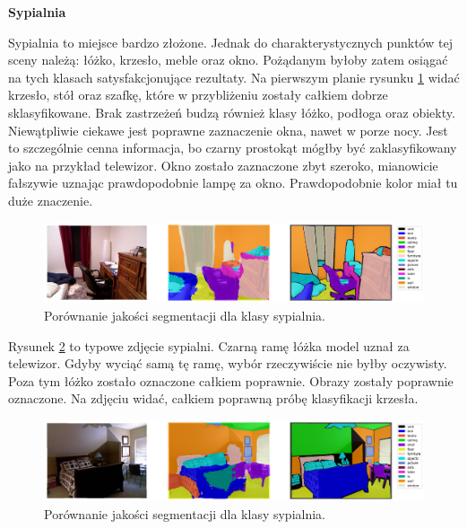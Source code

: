 \noindent
\textbf{Sypialnia}

Sypialnia to miejsce bardzo złożone. Jednak do charakterystycznych punktów tej sceny należą: łóżko, krzesło, meble oraz okno. Pożądanym byłoby zatem osiągać na tych klasach satysfakcjonujące rezultaty. Na pierwszym planie rysunku \ref{fig:bedroom-pred-1} widać krzesło, stół oraz szafkę, które w przybliżeniu zostały całkiem dobrze sklasyfikowane. Brak zastrzeżeń budzą również klasy łóżko, podłoga oraz obiekty. Niewątpliwie ciekawe jest poprawne zaznaczenie okna, nawet w porze nocy. Jest to szczególnie cenna informacja, bo czarny prostokąt mógłby być zaklasyfikowany jako na przykład telewizor. Okno zostało zaznaczone zbyt szeroko, mianowicie fałszywie uznając prawdopodobnie lampę za okno. Prawdopodobnie kolor miał tu duże znaczenie.

\begin{figure}[ht!]
    \centering
    \includegraphics[width=\textwidth]{img/preds_analysis/gt_vs_pred/bedroom-1.png}
    \caption{Porównanie jakości segmentacji dla klasy sypialnia.}
    \label{fig:bedroom-pred-1}
\end{figure}

Rysunek \ref{fig:bedroom-pred-2} to typowe zdjęcie sypialni. Czarną ramę łóżka model uznał za telewizor. Gdyby wyciąć samą tę ramę, wybór rzeczywiście nie byłby oczywisty. Poza tym łóżko zostało oznaczone całkiem poprawnie. Obrazy zostały poprawnie oznaczone. Na zdjęciu widać, całkiem poprawną próbę klasyfikacji krzesła.

\begin{figure}[ht!]
    \centering
    \includegraphics[width=\textwidth]{img/preds_analysis/gt_vs_pred/bedroom-2.png}
    \caption{Porównanie jakości segmentacji dla klasy sypialnia.}
    \label{fig:bedroom-pred-2}
\end{figure}

